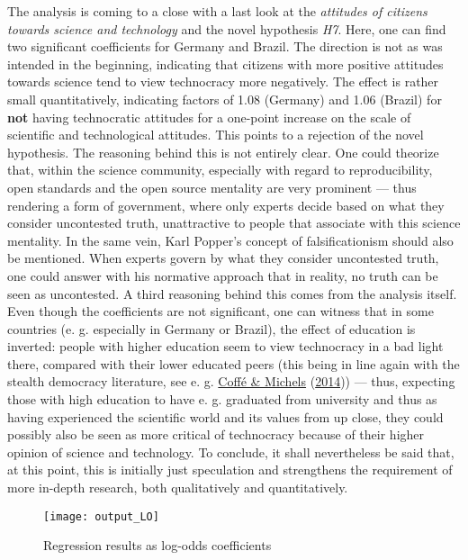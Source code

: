 \documentclass[
  12pt,
  english,
]{article}
\begin{document}
The analysis is coming to a close with a last look at the
\emph{attitudes of citizens towards science and technology} and the
novel hypothesis \emph{H7}. Here, one can find two significant
coefficients for Germany and Brazil. The direction is not as was
intended in the beginning, indicating that citizens with more positive
attitudes towards science tend to view technocracy more negatively. The
effect is rather small quantitatively, indicating factors of 1.08
(Germany) and 1.06 (Brazil) for \textbf{not} having technocratic
attitudes for a one-point increase on the scale of scientific and
technological attitudes. This points to a rejection of the novel
hypothesis. The reasoning behind this is not entirely clear. One could
theorize that, within the science community, especially with regard to
reproducibility, open standards and the open source mentality are very
prominent --- thus rendering a form of government, where only experts
decide based on what they consider uncontested truth, unattractive to
people that associate with this science mentality. In the same vein,
Karl Popper's concept of falsificationism should also be mentioned. When
experts govern by what they consider uncontested truth, one could answer
with his normative approach that in reality, no truth can be seen as
uncontested. A third reasoning behind this comes from the analysis
itself. Even though the coefficients are not significant, one can
witness that in some countries (e. g. especially in Germany or Brazil),
the effect of education is inverted: people with higher education seem
to view technocracy in a bad light there, compared with their lower
educated peers (this being in line again with the stealth democracy
literature, see e. g. \protect\hyperlink{ref-coffe2014education}{Coffé
\& Michels} (\protect\hyperlink{ref-coffe2014education}{2014})) ---
thus, expecting those with high education to have e. g. graduated from
university and thus as having experienced the scientific world and its
values from up close, they could possibly also be seen as more critical
of technocracy because of their higher opinion of science and
technology. To conclude, it shall nevertheless be said that, at this
point, this is initially just speculation and strengthens the
requirement of more in-depth research, both qualitatively and
quantitatively.

\begin{figure}

{\centering \texttt{[image: output\_LO]} 

}

\caption{Regression results as log-odds coefficients}\label{fig:insert graphics: LO table}
\end{figure}
\end{document}
